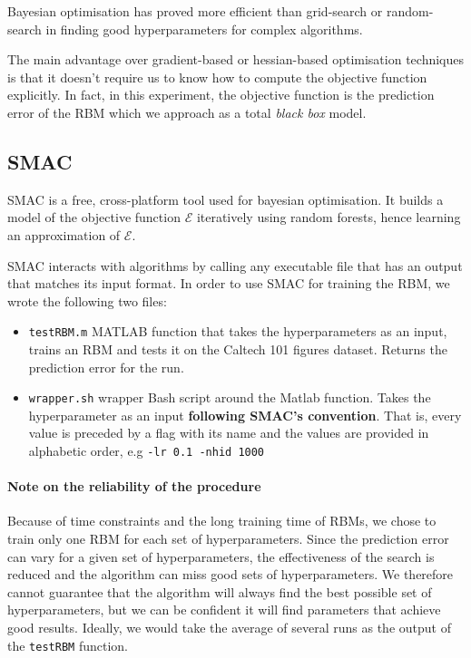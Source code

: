 \documentclass[10pt,a4paper, twocolumn]{article}
\theoremstyle{definition}
\begin{document}
Bayesian optimisation has proved more efficient than grid-search or random-search in finding good hyperparameters for complex algorithms.

The main advantage over gradient-based or hessian-based optimisation techniques is that it doesn't require us to know how to compute the objective function explicitly. In fact, in this experiment, the objective function is the prediction error of the RBM which we approach as a total \textit{black box} model.
\subsection{SMAC}
SMAC is a free, cross-platform tool used for bayesian optimisation. It builds a model of the objective function $\mathcal{E}$ iteratively using random forests, hence learning an approximation of $\mathcal{E}$.

SMAC interacts with algorithms by calling any executable file that has an output that matches its input format. In order to use SMAC for training the RBM, we wrote the following two files:
\begin{itemize}
\item \texttt{testRBM.m} MATLAB function that takes the hyperparameters as an input, trains an RBM and tests it on the Caltech 101 figures dataset. Returns the prediction error for the run.
\item \texttt{wrapper.sh} wrapper Bash script around the Matlab function. Takes the hyperparameter as an input \textbf{following SMAC's convention}. That is, every value is preceded by a flag with its name and the values are provided in alphabetic order, e.g \texttt{-lr 0.1 -nhid 1000}
\end{itemize}

\paragraph{Note on the reliability of the procedure}

Because of time constraints and the long training time of RBMs, we chose to train only one RBM for each set of hyperparameters. Since the prediction error can vary for a given set of hyperparameters, the effectiveness of the search is reduced and the algorithm can miss good sets of hyperparameters. We therefore cannot guarantee that the algorithm will always find the best possible set of hyperparameters, but we can be confident it will find parameters that achieve good results. Ideally, we would take the average of several runs as the output of the \texttt{testRBM} function.
\end{document}
